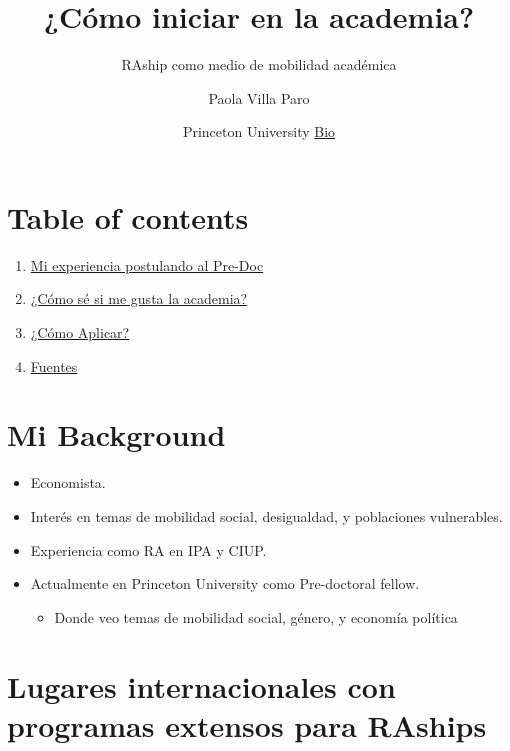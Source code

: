 \documentclass[
]{article}
\title{¿Cómo iniciar en la academia?}
\subtitle{RAship como medio de mobilidad académica}
\author{Paola Villa Paro}
\date{Princeton University \textbar{} \href{https://pvillaparo.github.io}{Bio}}
\providecommand{\tightlist}{%
  \setlength{\itemsep}{0pt}\setlength{\parskip}{0pt}}
\begin{document}
\maketitle

\hypertarget{table-of-contents}{%
\section{Table of contents}\label{table-of-contents}}

\begin{enumerate}
\def\labelenumi{\arabic{enumi}.}
\item
  \protect\hyperlink{experiencia}{Mi experiencia postulando al Pre-Doc}
\item
  \protect\hyperlink{comose}{¿Cómo sé si me gusta la academia?}
\item
  \protect\hyperlink{comoapp}{¿Cómo Aplicar?}
\item
  \protect\hyperlink{fuentes}{Fuentes}
\end{enumerate}

\hypertarget{mi-background}{%
\section{Mi Background}\label{mi-background}}

\begin{itemize}
\item
  Economista.
\item
  Interés en temas de mobilidad social, desigualdad, y poblaciones
  vulnerables.
\item
  Experiencia como RA en IPA y CIUP.
\item
  Actualmente en Princeton University como Pre-doctoral fellow.

  \begin{itemize}
  \tightlist
  \item
    Donde veo temas de mobilidad social, género, y economía política
  \end{itemize}
\end{itemize}

\hypertarget{lugares-internacionales-con-programas-extensos-para-raships}{%
\section{Lugares internacionales con programas extensos para
RAships}\label{lugares-internacionales-con-programas-extensos-para-raships}}
\end{document}
